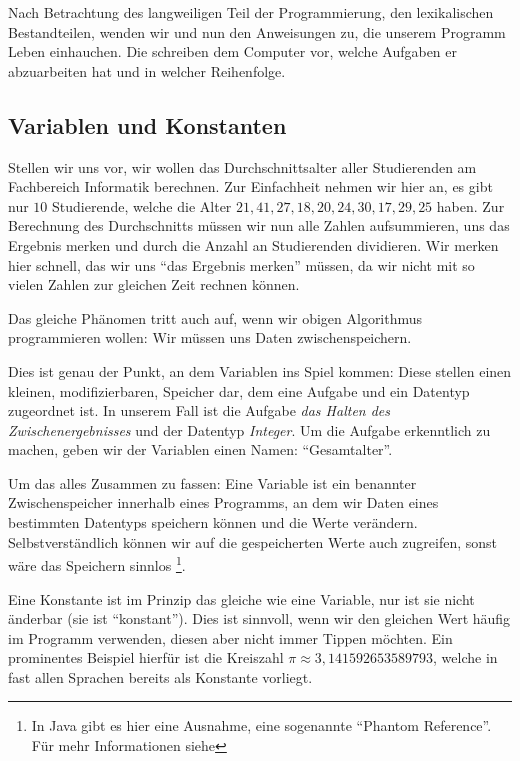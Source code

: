 Nach Betrachtung des langweiligen Teil der Programmierung, den lexikalischen Bestandteilen, wenden wir und nun den Anweisungen zu, die unserem Programm Leben einhauchen. Die schreiben dem Computer vor, welche Aufgaben er abzuarbeiten hat und in welcher Reihenfolge.

\subsection{Variablen und Konstanten} \imperativeMark \oopMark
	
	Stellen wir uns vor, wir wollen das Durchschnittsalter aller Studierenden am Fachbereich Informatik berechnen. Zur Einfachheit nehmen wir hier an, es gibt nur $ 10 $ Studierende, welche die Alter $ 21, 41, 27, 18, 20, 24, 30, 17, 29, 25 $ haben. Zur Berechnung des Durchschnitts müssen wir nun alle Zahlen aufsummieren, uns das Ergebnis merken und durch die Anzahl an Studierenden dividieren. Wir merken hier schnell, das wir uns \enquote{das Ergebnis merken} müssen, da wir nicht mit so vielen Zahlen zur gleichen Zeit rechnen können.
	
	Das gleiche Phänomen tritt auch auf, wenn wir obigen Algorithmus programmieren wollen: Wir müssen uns Daten zwischenspeichern.
	
	Dies ist genau der Punkt, an dem Variablen ins Spiel kommen: Diese stellen einen kleinen, modifizierbaren, Speicher dar, dem eine Aufgabe und ein Datentyp zugeordnet ist. In unserem Fall ist die Aufgabe \textit{das Halten des Zwischenergebnisses} und der Datentyp \textit{Integer}. Um die Aufgabe erkenntlich zu machen, geben wir der Variablen einen Namen: \enquote{Gesamtalter}.
	
	Um das alles Zusammen zu fassen: Eine Variable ist ein benannter Zwischenspeicher innerhalb eines Programms, an dem wir Daten eines bestimmten Datentyps speichern können und die Werte verändern. Selbstverständlich können wir auf die gespeicherten Werte auch zugreifen, sonst wäre das Speichern sinnlos \footnote{In Java gibt es hier eine Ausnahme, eine sogenannte \enquote{Phantom Reference}. Für mehr Informationen siehe }.
	
	Eine Konstante ist im Prinzip das gleiche wie eine Variable, nur ist sie nicht änderbar (sie ist \enquote{konstant}). Dies ist sinnvoll, wenn wir den gleichen Wert häufig im Programm verwenden, diesen aber nicht immer Tippen möchten. Ein prominentes Beispiel hierfür ist die Kreiszahl $ \pi \approx 3,141592653589793 $, welche in fast allen Sprachen bereits als Konstante vorliegt.
	
